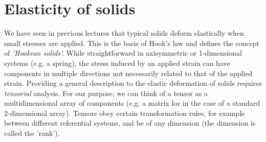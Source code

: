 \documentclass[a4paper, 11pt, normalem]{report}
\begin{document}
\section{Elasticity of solids}
We have seen in previous lectures that typical solids deform elastically when small stresses are applied.
This is the basis of Hook's law and defines the concept of \textit{'Hookean solids'.}
While straightforward in axisymmetric or 1-dimensional systems (e.g. a spring), the stress induced by an applied strain can have components in multiple directions not necessarily related to that of the applied strain.
Providing a general description to the elastic deformation of solids requires \textit{tensorial} analysis.
For our purpose, we can think of a tensor as a multidimensional array of components (e.g. a matrix for in the case of a standard 2-dimensional array).
Tensors obey certain transformation rules, for example between different referential systems, and be of any dimension (the dimension is called the 'rank').
\end{document}
